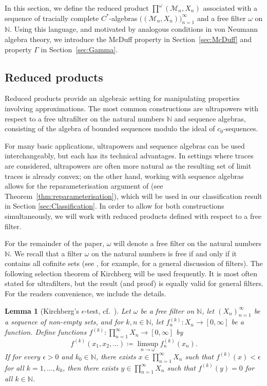 \documentclass[a4paper,11pt]{amsart}
\newtheorem{lemma}[theorem]{Lemma}
\theoremstyle{definition}
\numberwithin{equation}{section}
\numberwithin{theorem}{section}
\newcommand{\N}{\mathbb N}
\newcommand{\M}{\mathcal{M}}
\begin{document}
In this section, we define the reduced product $\prod^\omega(\M_n,X_n)$ associated with a sequence of tracially complete $C^*$-algebras $\big((\M_n,X_n)\big)_{n=1}^\infty$ and a free filter $\omega$ on $\N$. Using this language, and motivated by analogous conditions in von Neumann algebra theory, we introduce the \mbox{McDuff} property in Section~\ref{sec:McDuff} and property $\Gamma$ in Section~\ref{sec:Gamma}.



\subsection{Reduced products}\label{sec:reduced-product}

Reduced products provide an algebraic setting for manipulating properties involving approximations.  The most common constructions are ultrapowers with respect to a free ultrafilter on the natural numbers $\N$ and sequence algebras, consisting of the algebra of bounded sequences modulo the ideal of $c_0$-sequences.  

For many basic applications, ultrapowers and sequence algebras can be used interchangeably, but each has its technical advantages.  In settings where traces are considered, ultrapowers are often more natural as the resulting set of limit traces is already convex; on the other hand, working with sequence algebras allows for the reparameterisation argument of \cite[Theorem~4.3]{Gabe18} (see Theorem~\ref{thm:reparameterisation}), which will be used in our classification result in Section \ref{sec:Classification}.  In order to allow for both constructions simultaneously, we will work with reduced products defined with respect to a free filter.

For the remainder of the paper, $\omega$ will denote a free filter on the natural numbers $\N$.  We recall that a filter $\omega$ on the natural numbers is free if and only if it contains all cofinite sets (see \cite[Appendix~A]{Br08}, for example, for a general discussion of filters).  The following selection theorem of Kirchberg will be used frequently.  It is most often stated for ultrafilters, but the result (and proof) is equally valid for general filters.  For the readers convenience, we include the details.

\begin{lemma}[Kirchberg's $\epsilon$-test, {cf.\ \cite[Lemma A.1]{Kir06}}]
	\label{lem:EpsTest}
	Let $\omega$ be a free filter on $\mathbb N$,
	let $(X_n)_{n=1}^\infty$ be a sequence of non-empty sets, and for $k,n\in\mathbb N$, let $f^{(k)}_n\colon X_n\rightarrow [0,\infty]$ be a function.  Define functions $f^{(k)}\colon \prod_{n=1}^\infty X_n \to [0,\infty]$ by
	\begin{equation}
		\label{eq:EpsTest1}
		f^{(k)}(x_1,x_2,\dots) \coloneqq \limsup_{n\to\omega} f^{(k)}_n(x_n). 
	\end{equation}
	If for every $\epsilon>0$ and $k_0\in\mathbb N$, there exists $x\in \prod_{n=1}^\infty X_n$ such that $f^{(k)}(x)<\epsilon$ for all $k=1,\dots,k_0$, then there exists $y\in \prod_{n=1}^\infty X_n$ such that $f^{(k)}(y)=0$ for all $k\in\mathbb N$.
\end{lemma}
\end{document}
